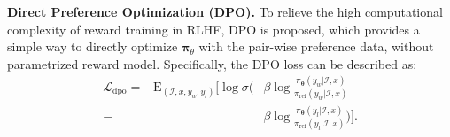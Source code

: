 \noindent \textbf{Direct Preference Optimization (DPO).}
To relieve the high computational complexity of reward training in RLHF, DPO \cite{DPO} is proposed, which provides a simple way to directly optimize $\bm{\pi}_{\theta}$ with the pair-wise preference data, without parametrized reward model. Specifically, the DPO loss can be described as:
\begin{equation}
\label{equ:dpo}
\begin{aligned}
    \mathcal{L}_{\mathrm{dpo}} = - \bm{\mathrm{E}}_{(\mathcal{I},x, y_{w}, y_{l})} [ {\log \sigma}( & \beta \log \frac{{\pi}_{\bm{\theta}}(y_{w}|\mathcal{I},x)}{{\pi}_{\mathrm{ref}}(y_{w}|\mathcal{I},x)} \\
    - & \beta \log \frac{{\pi}_{\bm{\theta}}(y_{l}|\mathcal{I},x)}{{\pi}_{\mathrm{ref}}(y_{l}|\mathcal{I},x)}) ].
\end{aligned}
\end{equation}